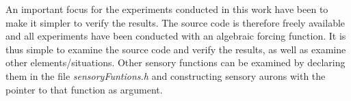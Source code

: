 
		An important focus for the experiments conducted in this work have been to make it simpler to verify the results.
		The source code is therefore freely available\cite{gitRepoCommit} and all experiments have been conducted with an algebraic forcing function.
		It is thus simple to examine the source code and verify the results, as well as examine other elements/situations.
		Other sensory functions can be examined by declaring them in the file \emph{sensoryFuntions.h} 
			and constructing sensory aurons with the pointer to that function as argument.

